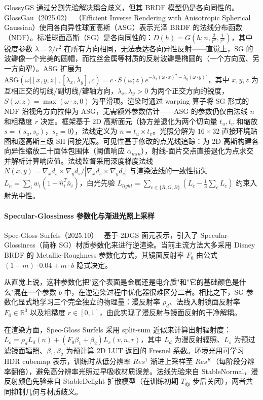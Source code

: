 GlossyGS 通过分割先验解决耦合歧义，但其 BRDF 模型仍是各向同性的。GlossGau（2025.02）~\cite{2502_14129}（Efficient Inverse Rendering with Anisotropic Spherical Gaussian）使用各向异性球面高斯（ASG）表示光泽 BRDF 的法线分布函数（NDF）。标准球面高斯（SG）是各向同性的：$D(h) = G(h; n, \frac{2}{r^2}, \frac{1}{r^2})$，其中锐度参数 $\lambda = 2/r^2$ 在所有方向相同，无法表达各向异性反射——直觉上，SG 的波瓣像一个完美的圆帽，而拉丝金属等材质的反射波瓣是椭圆的（一个方向宽、另一方向窄）。ASG 扩展为 $\text{ASG}(\omega | [x,y,z], [\lambda_x, \lambda_y], c) = c \cdot S(\omega; z) e^{-\lambda_x(\omega\cdot x)^2 - \lambda_y(\omega\cdot y)^2}$，其中 $x,y,z$ 为互相正交的切线/副切线/瓣轴方向，$\lambda_x, \lambda_y > 0$ 为两个正交方向的锐度，$S(\omega;z)=\max(\omega\cdot z, 0)$ 为平滑项。渲染时通过 warping 算子将 SG 形式的 NDF 沿视角方向拉伸为 ASG，无需额外参数估计——ASG 的参数仍仅由法线 $n$ 和粗糙度 $r$ 决定。框架基于 2D 高斯面元（协方差退化为两个切向量 $t_u, t_v$ 和缩放 $s=(s_u,s_v)$，$s_z=0$），法线定义为 $n = t_u \times t_v$。光照分解为 $16\times32$ 直接环境贴图和逐高斯三级 SH 间接光照。可见性基于修改的点光线追踪：为 2D 高斯构建各向异性缩放二十面体包围体（阈值响应 $\alpha_{min}$），射线-面片交点直接退化为点求交并解析计算响应值。法线监督采用深度梯度法线 $N(x,y) = \nabla_x d_s \times \nabla_y d_s / |\nabla_x d_s \times \nabla_y d_s|$ 与渲染法线的一致性损失 $L_n = \sum_i w_i (1 - \hat{n}_i^T \bar{n}_i)$，白光先验 $L_{light} = \sum_{c \in \{R,G,B\}}(L_c - \frac{1}{3}\sum_c L_c)$ 约束入射光中性。

\paragraph{Specular-Glossiness 参数化与渐进光照上采样}

Spec-Gloss Surfels（2025.10）~\cite{2510_02069} 基于 2DGS 面元表示，引入了 Specular-Glossiness（简称 SG）材质参数化来进行逆渲染。当前主流方法大多采用 Disney BRDF 的 Metallic-Roughness 参数化方式，其镜面反射率 $F_0$ 由公式 $(1-m)\cdot 0.04 + m\cdot b$ 隐式决定。

从直觉上说，这种参数化把"这个表面是金属还是电介质"和"它的基础颜色是什么"混在一个参数 $b$ 中，在逆渲染过程中优化器很难区分二者。相比之下，SG 参数化显式地学习三个完全独立的物理量：漫反射率 $\rho_d$、法线入射镜面反射率 $F_0 \in \mathbb{R}^3$ 以及粗糙度 $r \in [0,1]$，由此实现了漫反射与镜面反射的干净解耦。

在渲染方面，Spec-Gloss Surfels 采用 split-sum 近似来计算出射辐射度：$L_o = \rho_d L_d(n) + (F_0 \beta_1 + \beta_2) L_s(v,n,r)$，其中 $L_d$ 为漫反射辐照、$L_s$ 为预过滤镜面辐照、$\beta_1,\beta_2$ 为预计算 2D LUT 返回的 Fresnel 系数。环境光用可学习 HDR cubemap 表示，训练时从低分辨率 $Res^1$ 渐进上采样至 $Res^K$（每阶段分辨率翻倍），避免高分辨率光照过早吸收材质误差。法线先验来自 StableNormal，漫反射颜色先验来自 StableDelight 扩散模型（在训练初期 $T_{dp}$ 步后关闭），两者共同抑制几何与材质歧义。

